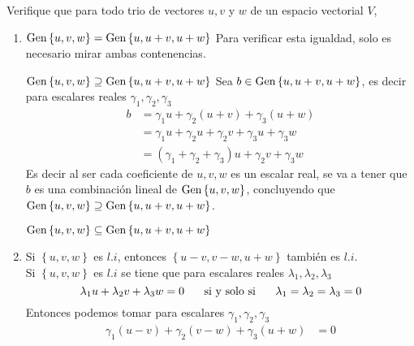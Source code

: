 \item Verifique que para todo trio de vectores \(u, v\) y \(w\) de un espacio vectorial \(V\),
    \begin{enumerate}[label=\listAlph]
        \item \(\text{Gen} \left\{ u, v, w \right\} = \text{Gen} \left\{ u, u + v, u + w \right\}\)
            Para verificar esta igualdad, solo es necesario mirar ambas contenencias.
            \ResetCases{}
            \begin{mathcase}{{\(\text{Gen} \left\{ u, v, w \right\} \supseteq \text{Gen} \left\{ u, u + v, u + w \right\}\)}}
                Sea \(b \in \text{Gen} \left\{ u, u + v, u + w \right\}\), es decir para escalares reales \(\gamma_1, \gamma_2, \gamma_3\)
                \[
                    \begin{aligned}
                        b 
                        &= \gamma_1 u + \gamma_2 (u + v) + \gamma_3 (u + w) \\
                        &= \gamma_1 u + \gamma_2 u + \gamma_2 v + \gamma_3 u + \gamma_3 w \\
                        &= (\gamma_1 + \gamma_2 + \gamma_3) u + \gamma_2 v + \gamma_3 w
                    \end{aligned}
                \]
                Es decir al ser cada coeficiente de \(u, v, w\) es un escalar real, se va a tener que 
                \(b\) es una combinación lineal de \(\text{Gen} \left\{ u, v, w \right\}\), concluyendo que \(\text{Gen} \left\{ u, v, w \right\} \supseteq \text{Gen} \left\{ u, u + v, u + w \right\}\).
            \end{mathcase}
            \begin{mathcase}{{\(\text{Gen} \left\{ u, v, w \right\} \subseteq \text{Gen} \left\{ u, u + v, u + w \right\}\)}}
            \end{mathcase}
        \item Si \(\left\{u, v, w\right\}\) es \(l.i\), entonces \(\left\{u - v, v - w, u + w\right\}\) también es \(l.i\). \\
            Si \(\left\{u, v, w\right\}\) es \(l.i\) se tiene que para escalares reales \(\lambda_1, \lambda_2, \lambda_3\)
            \[
                \lambda_1 u + \lambda_2 v + \lambda_3 w = 0 
                \hspace{0.5cm}
                \text{ si y solo si }
                \hspace{0.5cm}
                \lambda_1 = \lambda_2 = \lambda_3 = 0
            \]
            Entonces podemos tomar para escalares \(\gamma_1, \gamma_2, \gamma_3\)
            \[
                \begin{aligned}
                    \gamma_1 (u - v) + \gamma_2 (v - w) + \gamma_3 (u + w) &= 0 \\

\end{aligned}\]
\end{enumerate}
